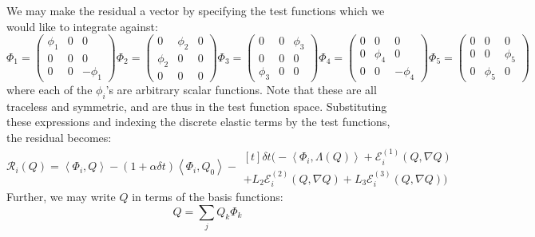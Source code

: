\documentclass[reqno]{article}
\begin{document}
We may make the residual a vector by specifying the test functions which we would like to integrate against:
\begin{equation}
    \Phi_1
    =
    \begin{pmatrix}
        \phi_1 & 0 & 0 \\
        0 & 0 & 0 \\
        0 & 0 & -\phi_1
    \end{pmatrix}
    \Phi_2
    =
    \begin{pmatrix}
        0 & \phi_2 & 0 \\
        \phi_2 & 0 & 0 \\
        0 & 0 & 0
    \end{pmatrix}
    \Phi_3
    =
    \begin{pmatrix}
        0 & 0 & \phi_3 \\
        0 & 0 & 0 \\
        \phi_3 & 0 & 0
    \end{pmatrix}
    \Phi_4
    =
    \begin{pmatrix}
        0 & 0 & 0 \\
        0 & \phi_4 & 0 \\
        0 & 0 & -\phi_4
    \end{pmatrix}
    \Phi_5
    =
    \begin{pmatrix}
        0 & 0 & 0 \\
        0 & 0 & \phi_5 \\
        0 & \phi_5 & 0
    \end{pmatrix}
\end{equation}
where each of the $\phi_i$'s are arbitrary scalar functions.
Note that these are all traceless and symmetric, and are thus in the test function space.
Substituting these expressions and indexing the discrete elastic terms by the test functions, the residual becomes:
\begin{equation}
    \mathcal{R}_i(Q)
    =
    \left<\Phi_i, Q\right> 
    - \left(1 + \alpha \delta t \right) \left<\Phi_i, Q_0\right>
    - 
    \begin{multlined}[t]
    \delta t \bigl(
    - \left<\Phi_i, \Lambda(Q) \right>
        + \mathcal{E}^{(1)}_i (Q, \nabla Q) \\
        + L_2 \mathcal{E}^{(2)}_i (Q, \nabla Q)
        + L_3 \mathcal{E}^{(3)}_i (Q, \nabla Q)
    \bigr)
    \end{multlined}
\end{equation}
Further, we may write $Q$ in terms of the basis functions:
\begin{equation}
    Q = \sum_j Q_k \Phi_k
\end{equation}
\end{document}

